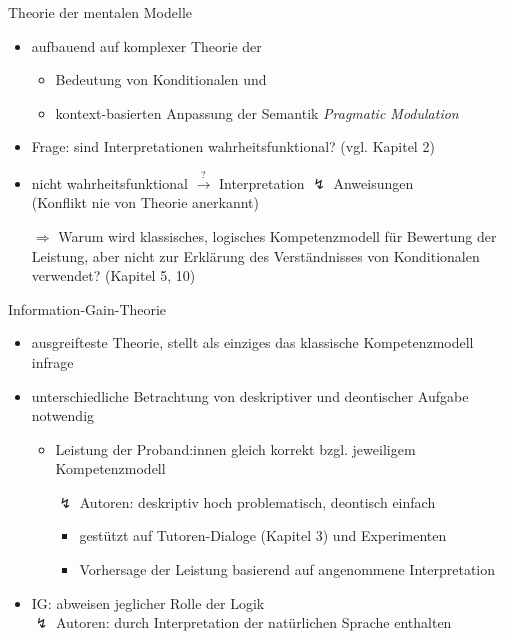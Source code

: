\begin{frame}{Theorie der mentalen Modelle {\scriptsize \cite[S.~113-114]{stenningHumanReasoningCognitive2008}}}
    \begin{itemize}
        \item aufbauend auf komplexer Theorie der
        \begin{itemize}
            \item Bedeutung von Konditionalen und
            \item kontext-basierten Anpassung der Semantik {\footnotesize \emph{Pragmatic Modulation}}
        \end{itemize}
        
        \item Frage: sind Interpretationen wahrheitsfunktional? {\scriptsize (vgl. Kapitel 2)}
        
        \item nicht wahrheitsfunktional $\overset?\to$ Interpretation $\lightning$ Anweisungen \\
            {\footnotesize (Konflikt nie von Theorie anerkannt)}
        \pause

        \item[$\Rightarrow$] Warum wird klassisches, logisches Kompetenzmodell für \alert{Bewertung der Leistung}, 
            aber nicht zur Erklärung des \alert{Verständnisses von Konditionalen} verwendet? {\footnotesize (Kapitel 5, 10)}
    \end{itemize}
\end{frame}


\begin{frame}{Information-Gain-Theorie {\scriptsize \cite[S.~114-115]{stenningHumanReasoningCognitive2008}}}
    \begin{itemize}
        \item ausgreifteste Theorie, stellt als einziges das klassische Kompetenzmodell infrage
        \item unterschiedliche Betrachtung von deskriptiver und deontischer Aufgabe notwendig
        
        \pause
        \begin{itemize}
            \item Leistung der Proband:innen gleich korrekt bzgl. jeweiligem Kompetenzmodell
            \item[$\lightning$] Autoren: deskriptiv hoch problematisch, deontisch einfach
            \begin{itemize}
                \item gestützt auf Tutoren-Dialoge (Kapitel 3) und Experimenten
                \item Vorhersage der Leistung basierend auf angenommene Interpretation
            \end{itemize}
        \end{itemize}

        \pause
        \item IG: abweisen jeglicher Rolle der Logik \\
            $\lightning$ Autoren: durch Interpretation der natürlichen Sprache enthalten
    \end{itemize}
\end{frame}


